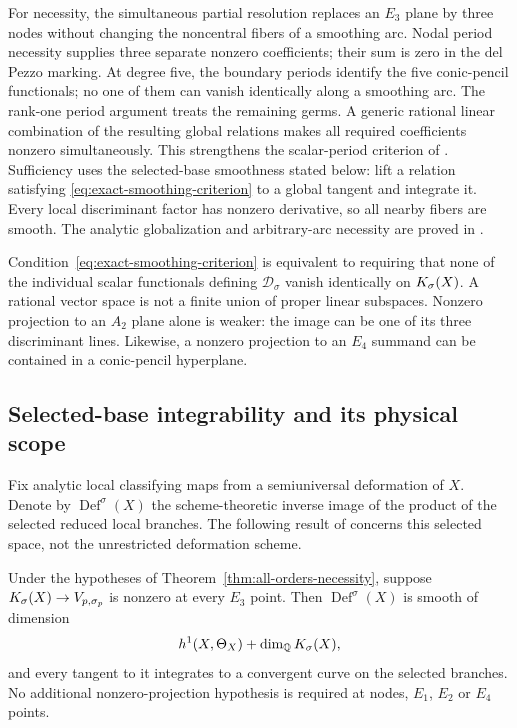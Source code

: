 For necessity, the simultaneous partial resolution replaces an $E_3$
plane by three nodes without changing the noncentral fibers of a smoothing
arc. Nodal period necessity supplies three separate nonzero coefficients;
their sum is zero in the del Pezzo marking. At degree five, the boundary
periods identify the five conic-pencil functionals; no one of them can
vanish identically along a smoothing arc. The rank-one period argument
treats the remaining germs. A generic rational linear combination of the
resulting global relations makes all required coefficients nonzero
simultaneously. This strengthens the scalar-period criterion of
\cite{Wuebben:2026obstruction}. Sufficiency uses the selected-base
smoothness stated below: lift a relation satisfying
\eqref{eq:exact-smoothing-criterion} to a global tangent and integrate it.
Every local discriminant factor has nonzero derivative, so all nearby
fibers are smooth. The analytic globalization and arbitrary-arc necessity
are proved in \cite[Section~4]{Wuebben:2026smoothing}.

\begin{remark}\label{rem:full-support}
Condition~\eqref{eq:exact-smoothing-criterion} is equivalent to requiring
that none of the individual scalar functionals defining
$\mathcal D_\sigma$ vanish identically on $K_{\sigma}(X)$. A rational vector
space is not a finite union of proper linear subspaces. Nonzero projection
to an $A_2$ plane alone is weaker: the image can be one of its three
discriminant lines. Likewise, a nonzero projection to an $E_4$ summand can
be contained in a conic-pencil hyperplane.
\end{remark}

\subsection{Selected-base integrability and its physical scope}
\label{subsec:integrability}

Fix analytic local classifying maps from a semiuniversal deformation of
$X$. Denote by $\operatorname{Def}^{\sigma}(X)$ the scheme-theoretic inverse
image of the product of the selected reduced local branches. The following
result of \cite[Theorem~4.5]{Wuebben:2026smoothing} concerns this
selected space, not the unrestricted deformation scheme.

\begin{theorem}\label{thm:selected-integrability}
Under the hypotheses of Theorem~\ref{thm:all-orders-necessity}, suppose
$K_{\sigma}(X)\to V_{p,\sigma_p}$ is nonzero at every $E_3$ point.
Then $\operatorname{Def}^{\sigma}(X)$ is smooth of dimension
\begin{equation}
 h^1(X,\Theta_X)+\dim_{\mathbb Q}K_{\sigma}(X),
 \label{eq:selected-base-dimension}
\end{equation}
and every tangent to it integrates to a convergent curve on the selected
branches. No additional nonzero-projection hypothesis is required at
nodes, $E_1$, $E_2$ or $E_4$ points.
\end{theorem}

